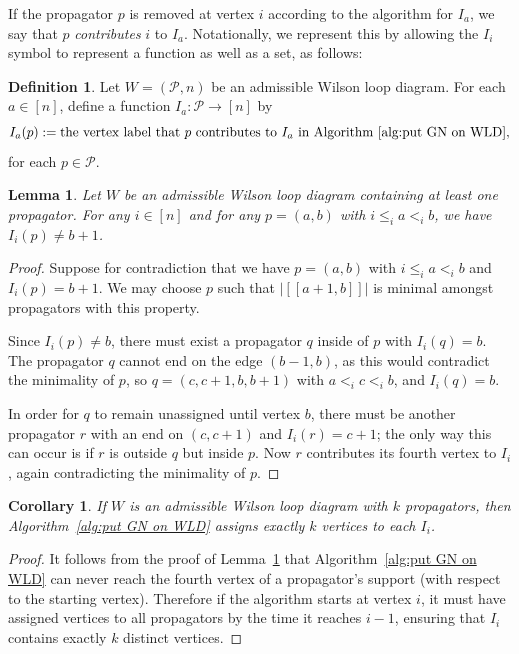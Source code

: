 \documentclass[11pt]{article}
\newcommand{\cP}{\mathcal{P}}
\newcommand{\interval}[2]{[\![#1,#2]\!]}
\newtheorem{lem}[thm]{Lemma}
\newtheorem{cor}[thm]{Corollary}
\theoremstyle{remark}
\theoremstyle{definition}
\newtheorem{dfn}[thm]{Definition}
\begin{document}
If the propagator $p$ is removed at vertex $i$ according to the algorithm for $I_a$, we say that $p$ \emph{contributes} $i$ to $I_a$. Notationally, we represent this by allowing the $I_i$ symbol to represent a function as well as a set, as follows:
\begin{dfn}\label{def I_i as a function}
Let $W = (\cP, n)$ be an admissible Wilson loop diagram. For each $a \in [n]$, define a function $I_a : \cP \longrightarrow [n]$ by
\[I_a(p) := \text{the vertex label that $p$ contributes to $I_a$ in Algorithm~\ref{alg:put GN on WLD},}\]
for each $p \in \cP$.
\end{dfn}






\begin{lem}\label{lem no fourth vertex}
Let $W$ be an admissible Wilson loop diagram containing at least one propagator. For any $i \in [n]$ and for any $p=(a,b)$ with $i\leq_i a <_i b$, we have $I_i(p) \neq b+1$.
\end{lem}
\begin{proof}
Suppose for contradiction that we have $p = (a,b)$ with $i\leq_i a <_i b$ and $I_{i}(p) = b+1$. We may choose $p$ such that $|\interval{a+1}{b}|$ is minimal amongst propagators with this property.

Since $I_i(p) \neq b$, there must exist a propagator $q$ inside of $p$ with $I_i(q) = b$. The propagator $q$ cannot end on the edge $(b-1,b)$, as this would contradict the minimality of $p$, so $q = (c,c+1,b,b+1)$ with $a <_i c <_i b$, and $I_i(q) = b$. 

In order for $q$ to remain unassigned until vertex $b$, there must be another propagator $r$ with an end on $(c,c+1)$ and $I_i(r) = c+1$; the only way this can occur is if $r$ is outside $q$ but inside $p$. Now $r$ contributes its fourth vertex to $I_i$, again contradicting the minimality of $p$.
\end{proof}

\begin{cor}\label{GN alg well defined}
If $W$ is an admissible Wilson loop diagram with $k$ propagators, then Algorithm~\ref{alg:put GN on WLD} assigns exactly $k$ vertices to each $I_i$.
\end{cor}
\begin{proof}
It follows from the proof of Lemma~\ref{lem no fourth vertex} that Algorithm~\ref{alg:put GN on WLD} can never reach the fourth vertex of a propagator's support (with respect to the starting vertex). Therefore if the algorithm starts at vertex $i$, it must have assigned vertices to all propagators by the time it reaches $i-1$, ensuring that $I_i$ contains exactly $k$ distinct vertices.
\end{proof}
\end{document}
